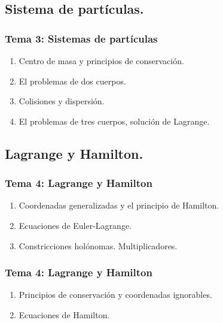 \documentclass[12pt]{beamer}
\begin{document}
\subsection{Sistema de partículas.}

\begin{frame}
\frametitle{\textbf{Tema 3: Sistemas de partículas}}
\begin{enumerate}[<+->]
\item Centro de masa y principios de conservación.
\item El problemas de dos cuerpos.
\item Colisiones y dispersión.
\item El problemas de tres cuerpos, solución de Lagrange.
\end{enumerate}
\end{frame}

\subsection{Lagrange y Hamilton.}

\begin{frame}
\frametitle{\textbf{Tema 4: Lagrange y Hamilton}}
\begin{enumerate}[<+->]
\item Coordenadas generalizadas y el principio de Hamilton.
\item Ecuaciones de Euler-Lagrange.
\item Constricciones holónomas. Multiplicadores.
\seti
\end{enumerate}
\end{frame}
\begin{frame}
\frametitle{\textbf{Tema 4: Lagrange y Hamilton}}
\begin{enumerate}[<+->]
\conti
\item Principios de conservación y coordenadas ignorables.
\item Ecuaciones de Hamilton.
\end{enumerate}
\end{frame}
\end{document}

